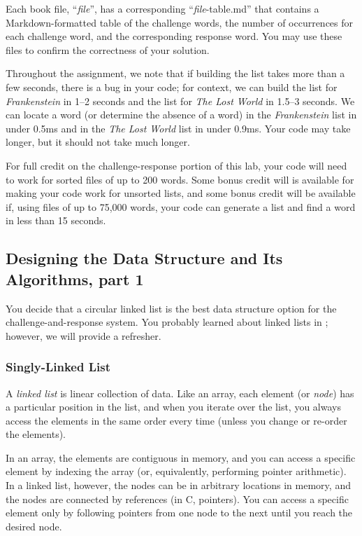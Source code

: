 Each book file, ``\textit{file}'', has a corresponding ``\textit{file}-table.md'' that contains a Markdown-formatted table of the challenge words, the number of occurrences for each challenge word, and the corresponding response word.
You may use these files to confirm the correctness of your solution.

Throughout the assignment, we note that if building the list takes more than a few seconds, there is a bug in your code;
for context, we can build the list for \textit{Frankenstein} in 1--2 seconds and the list for \textit{The Lost World} in 1.5--3 seconds.
We can locate a word (or determine the absence of a word) in the \textit{Frankenstein} list in under 0.5ms and in the \textit{The Lost World} list in under 0.9ms.
Your code may take longer, but it should not take much longer.

For full credit on the challenge-response portion of this lab, your code will need to work for sorted files of up to 200 words.
Some bonus credit will is available for making your code work for unsorted lists, and some bonus credit will be available if, using files of up to 75,000 words, your code can generate a list and find a word in less than 15 seconds.

\subsection{Designing the Data Structure and Its Algorithms, part 1}

You decide that a circular linked list is the best data structure option for the challenge-and-response system.
You probably learned about linked lists in \cstwo; however, we will provide a refresher.

\subsubsection{Singly-Linked List} \label{subsubsec:singlylinkedlist}

A \textit{linked list} is linear collection of data.
Like an array, each element (or \textit{node}) has a particular position in the list, and when you iterate over the list, you always access the elements in the same order every time (unless you change or re-order the elements).

In an array, the elements are contiguous in memory, and you can access a specific element by indexing the array (or, equivalently, performing pointer arithmetic).
In a linked list, however, the nodes can be in arbitrary locations in memory, and the nodes are connected by references (in C, pointers).
You can access a specific element only by following pointers from one node to the next until you reach the desired node.

